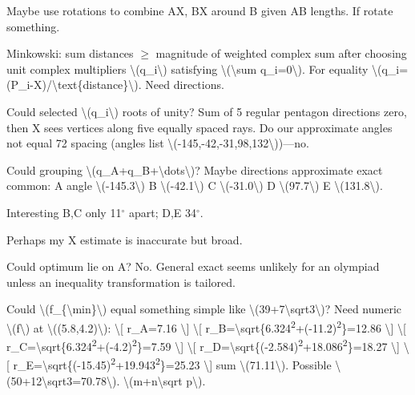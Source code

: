 \begin{decodedreasoningpanel}
Maybe use rotations to combine AX, BX around B given AB lengths. If rotate something.

Minkowski: sum distances \ensuremath{\geq} magnitude of weighted complex sum after choosing unit complex multipliers \textbackslash{}(q\_i\textbackslash{}) satisfying \textbackslash{}(\textbackslash{}sum q\_i=0\textbackslash{}). For equality \textbackslash{}(q\_i=(P\_i-X)/\textbackslash{}text\{distance\}\textbackslash{}). Need directions.

Could selected \textbackslash{}(q\_i\textbackslash{}) roots of unity? Sum of 5 regular pentagon directions zero, then X sees vertices along five equally spaced rays. Do our approximate angles not equal 72 spacing (angles list \textbackslash{}(-145,-42,-31,98,132\textbackslash{}))---no.

Could grouping \textbackslash{}(q\_A+q\_B+\textbackslash{}dots\textbackslash{})? Maybe directions approximate exact common:
A angle \textbackslash{}(-145.3\textbackslash{})  
B \textbackslash{}(-42.1\textbackslash{})  
C \textbackslash{}(-31.0\textbackslash{})  
D \textbackslash{}(97.7\textbackslash{})  
E \textbackslash{}(131.8\textbackslash{}).

Interesting B,C only 11\ensuremath{^\circ} apart; D,E 34\ensuremath{^\circ}.

Perhaps my X estimate is inaccurate but broad.

Could optimum lie on A? No. General exact seems unlikely for an olympiad unless an inequality transformation is tailored.

Could \textbackslash{}(f\_\{\textbackslash{}min\}\textbackslash{}) equal something simple like \textbackslash{}(39+7\textbackslash{}sqrt3\textbackslash{})? Need numeric \textbackslash{}(f\textbackslash{}) at \textbackslash{}((5.8,4.2)\textbackslash{}):
\textbackslash{}[
r\_A=7.16
\textbackslash{}]
\textbackslash{}[
r\_B=\textbackslash{}sqrt\{6.324\textsuperscript{2}+(-11.2)\textsuperscript{2}\}=12.86
\textbackslash{}]
\textbackslash{}[
r\_C=\textbackslash{}sqrt\{6.324\textsuperscript{2}+(-4.2)\textsuperscript{2}\}=7.59
\textbackslash{}]
\textbackslash{}[
r\_D=\textbackslash{}sqrt\{(-2.584)\textsuperscript{2}+18.086\textsuperscript{2}\}=18.27
\textbackslash{}]
\textbackslash{}[
r\_E=\textbackslash{}sqrt\{(-15.45)\textsuperscript{2}+19.943\textsuperscript{2}\}=25.23
\textbackslash{}]
sum \textbackslash{}(71.11\textbackslash{}). Possible \textbackslash{}(50+12\textbackslash{}sqrt3=70.78\textbackslash{}). \textbackslash{}(m+n\textbackslash{}sqrt p\textbackslash{}).


\end{decodedreasoningpanel}
